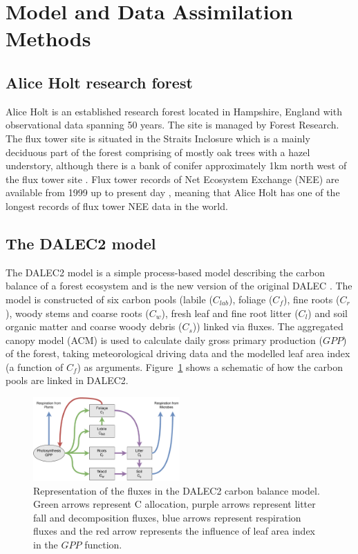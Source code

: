 \documentclass[11pt]{article}
\begin{document}
\section{Model and Data Assimilation Methods}

\subsection{Alice Holt research forest}

Alice Holt is an established research forest located in Hampshire, England with observational data spanning 50 years. The site is managed by Forest Research. The flux tower site is situated in the Straits Inclosure which is a mainly deciduous part of the forest comprising of mostly oak trees with a hazel understory, although there is a bank of conifer approximately 1km north west of the flux tower site \citep{pitman2001leaf}. Flux tower records of Net Ecosystem Exchange (NEE) are available from 1999 up to present day \citep{wilkinson2012inter}, meaning that Alice Holt has one of the longest records of flux tower NEE data in the world. 

\subsection{The DALEC2 model}

The DALEC2 model is a simple process-based model describing the carbon balance of a forest ecosystem \citep{Bloom2015} and is the new version of the original DALEC \citep{williams2005improved}. The model is constructed of six carbon pools (labile ($C_{lab}$), foliage ($C_f$), fine roots ($C_r$), woody stems and coarse roots ($C_w$), fresh leaf and fine root litter ($C_l$) and soil organic matter and coarse woody debris ($C_s$)) linked via fluxes. The aggregated canopy model (ACM) \citep{williams1997predicting} is used to calculate daily gross primary production ($GPP$) of the forest, taking meteorological driving data and the modelled leaf area index (a function of $C_f$) as arguments. Figure~\ref{fig:DALEC_mod} shows a schematic of how the carbon pools are linked in DALEC2.   

\begin{figure}[ht]
    \centering
    \includegraphics[width=0.5\textwidth]{DALECdiagram.pdf}
    \caption{Representation of the fluxes in the DALEC2 carbon balance model. Green arrows represent C allocation, purple arrows represent litter fall and decomposition fluxes, blue arrows represent respiration fluxes and the red arrow represents the influence of leaf area index in the $GPP$ function.}
    \label{fig:DALEC_mod}
\end{figure}
\end{document}
